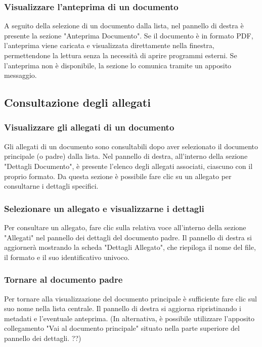 \documentclass[a4paper,12pt]{article}
\begin{document}
            \subsubsection{Visualizzare l'anteprima di un documento}
            A seguito della selezione di un documento dalla lista, nel pannello di destra è presente la sezione "Anteprima Documento". Se il documento è in formato PDF, l'anteprima viene caricata e visualizzata direttamente nella finestra, permettendone la lettura senza la necessità di aprire programmi esterni.
            Se l'anteprima non è disponibile, la sezione lo comunica tramite un apposito messaggio.
        \subsection{Consultazione degli allegati}
            \subsubsection{Visualizzare gli allegati di un documento}
            \label{sec:allegati}
            Gli allegati di un documento sono consultabili dopo aver selezionato il documento principale (o padre) dalla lista. Nel pannello di destra, all'interno della sezione "Dettagli Documento", è presente l'elenco degli allegati associati, ciascuno con il proprio formato. Da questa sezione è possibile fare clic su un allegato per consultarne i dettagli specifici.
        
            \subsubsection{Selezionare un allegato e visualizzarne i dettagli}
            Per consultare un allegato, fare clic sulla relativa voce all'interno della sezione "Allegati" nel pannello dei dettagli del documento padre. Il pannello di destra si aggiornerà mostrando la scheda "Dettagli Allegato", che riepiloga il nome del file, il formato e il suo identificativo univoco.
            \subsubsection{Tornare al documento padre}
            Per tornare alla visualizzazione del documento principale è sufficiente fare clic sul suo nome nella lista centrale. Il pannello di destra si aggiorna ripristinando i metadati e l'eventuale anteprima.
            (In alternativa, è possibile utilizzare l'apposito collegamento "Vai al documento principale" situato nella parte superiore del pannello dei dettagli. ??)
\end{document}
